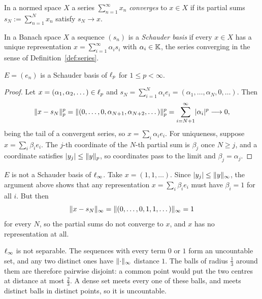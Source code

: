 \begin{definition}\label{def:series}
In a normed space $X$ a series $\sum_{n=1}^{\infty} x_n$ \emph{converges} to
$x \in X$ if its partial sums $s_N := \sum_{n=1}^{N} x_n$ satisfy
$s_N \to x$.
\end{definition}

\begin{definition}\label{def:schauder}
In a Banach space $X$ a sequence $(s_n)$ is a \emph{Schauder basis} if every
$x \in X$ has a unique representation $x = \sum_{i=1}^{\infty} \alpha_i s_i$
with $\alpha_i \in \mathbb{K}$, the series converging in the sense of
Definition~\ref{def:series}.
\end{definition}

\begin{example}\label{ex:E-schauder}
$E = (e_n)$ is a Schauder basis of $\ell_{p}$ for $1 \le p < \infty$.
\end{example}

\begin{proof}
Let $x = (\alpha_1, \alpha_2, \dots) \in \ell_{p}$ and
$s_N = \sum_{i=1}^{N} \alpha_i e_i = (\alpha_1, \dots, \alpha_N, 0, \dots)$.
Then
\[
  \lVert x - s_N\rVert_p^p
  = \lVert(0, \dots, 0, \alpha_{N+1}, \alpha_{N+2}, \dots)\rVert_p^p
  = \sum_{i=N+1}^{\infty} \lvert\alpha_i\rvert^p \longrightarrow 0,
\]
being the tail of a convergent series, so $x = \sum_i \alpha_i e_i$. For
uniqueness, suppose $x = \sum_i \beta_i e_i$. The $j$-th coordinate of the
$N$-th partial sum is $\beta_j$ once $N \ge j$, and a coordinate satisfies
$\lvert y_j\rvert \le \lVert y\rVert_p$, so coordinates pass to the limit and
$\beta_j = \alpha_j$.
\end{proof}

\begin{remark}\label{rem:E-linfty}
$E$ is not a Schauder basis of $\ell_{\infty}$. Take $x = (1, 1, \dots)$.
Since $\lvert y_j\rvert \le \lVert y\rVert_\infty$, the argument above shows that any
representation $x = \sum_i \beta_i e_i$ must have $\beta_i = 1$ for all $i$.
But then
\[
  \lVert x - s_N\rVert_\infty = \lVert(0, \dots, 0, 1, 1, \dots)\rVert_\infty = 1
\]
for every $N$, so the partial sums do not converge to $x$, and $x$ has no
representation at all.
\end{remark}

\begin{remark}\label{rem:linfty-nonsep}
$\ell_{\infty}$ is not separable. The sequences with every term $0$ or $1$ form
an uncountable set, and any two distinct ones have $\lVert\cdot\rVert_\infty$
distance $1$. The balls of radius $\frac{1}{3}$ around them are therefore
pairwise disjoint: a common point would put the two centres at distance at
most $\frac{2}{3}$. A dense set meets every one of these balls, and meets
distinct balls in distinct points, so it is uncountable.
\end{remark}

